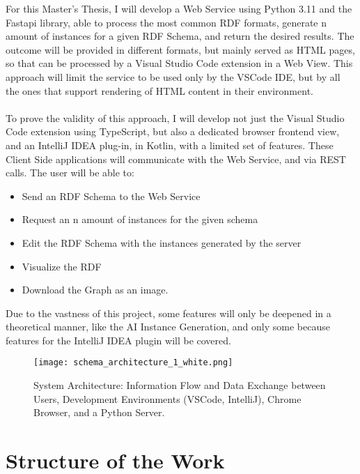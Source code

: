 For this Master's Thesis, I will develop a Web Service using Python 3.11 and the Fastapi library, able to process the most common RDF formats, generate n amount of instances for a given RDF Schema, and return the desired results. 
The outcome will be provided in different formats, but mainly served as HTML pages, so that can be processed by a Visual Studio Code extension in a Web View. This approach will limit the service to be used only by the VSCode IDE, but by all the ones that support rendering of HTML content in their environment.
\\
\\
To prove the validity of this approach, I will develop not just the Visual Studio Code extension using TypeScript, but also a dedicated browser frontend view, and an IntelliJ IDEA plug-in, in Kotlin, with a limited set of features. 
These Client Side applications will communicate with the Web Service, and via REST calls. The user will be able to: 
\begin{itemize}
      \item Send an RDF Schema to the Web Service
      \item Request an n amount of instances for the given schema
      \item Edit the RDF Schema with the instances generated by the server
      \item Visualize the RDF
      \item Download the Graph as an image. 
\end{itemize}
Due to the vastness of this project, some features will only be deepened in a theoretical manner, like the AI Instance Generation, and only some because features for the IntelliJ IDEA plugin will be covered.
\\
\begin{figure}[htb]
  \centering
  \texttt{[image: schema\_architecture\_1\_white.png]}\\
  \caption{System Architecture: Information Flow and Data Exchange between Users, Development Environments (VSCode, IntelliJ), Chrome Browser, and a Python Server.}\label{fig:intro}
\end{figure}

\section{Structure of the Work \label{sec:outline}}

